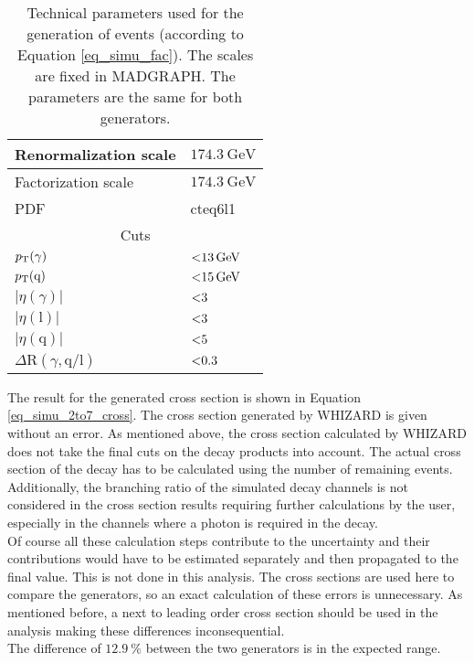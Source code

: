 \begin{table}[ht]
\centering
    \caption{Technical parameters used for the generation of \ttgamma events (according to\\ Equation \ref{eq_simu_fac}). The scales are fixed in MADGRAPH. The parameters are the same for both generators.}
    \begin{tabular}{| l | l |}

    \hline
    Renormalization scale & $ \SI{174.3}{\giga \electronvolt} $ \\
    \hline
    Factorization scale & $ \SI{174.3}{\giga \electronvolt} $ \\
    \hline
    PDF & cteq6l1 \\
    \hline
    \multicolumn{2}{|c|}{Cuts} \\
    \hline
    $p_{\mathrm{T}}(\gamma)$ & $\SI{<13}{\giga \electronvolt}$ \\
    \hline
    $p_{\mathrm{T}}(\mathrm{q})$ & $\SI{<15}{\giga \electronvolt}$ \\
    \hline
    $| \eta(\gamma)|$ & $\SI{<3}{}$ \\
    \hline
    $| \eta(\mathrm{l})|$ & $\SI{<3}{}$ \\
    \hline
    $| \eta(\mathrm{q})|$ & $\SI{<5}{}$ \\
    \hline
    $\Delta \mathrm{R}(\gamma,\mathrm{q/l})$ & $\num{<0.3}$ \\
    \hline
    \end{tabular}
     \label{tab_simu_2to7}
\end{table}

The result for the generated cross section is shown in Equation \ref{eq_simu_2to7_cross}. 
The cross section generated by WHIZARD is given without an error. As mentioned above, the cross section calculated by WHIZARD does not take the final cuts on the decay products into account. The actual cross section of the decay has to be calculated using the number of remaining events. Additionally, the branching ratio of the simulated decay channels is not considered in the cross section results requiring further calculations by the user, especially in the channels where a photon is required in the decay. \\
Of course all these calculation steps contribute to the uncertainty and their contributions would have to be estimated separately and then propagated to the final value. This is not done in this analysis. The cross sections are used here to compare the generators, so an exact calculation of these errors is unnecessary. As mentioned before, a next to leading order cross section should be used in the analysis making these differences inconsequential. \\
The difference of $\SI{12.9}{\percent}$ between the two generators is in the expected range. 

